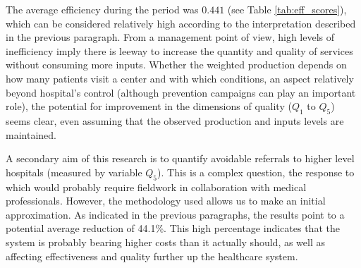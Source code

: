\documentclass[11pt,a4paper,oneside]{article}
\begin{document}

The average efficiency during the period was $0.441$ (see Table \ref{tab:eff_scores}), which can be considered relatively high according to the interpretation described in the previous paragraph. From a management point of view, high levels of inefficiency imply there is leeway to increase the quantity and quality of services without consuming more inputs. Whether the weighted production depends on how many patients visit a center and with which conditions, an aspect relatively beyond hospital's control (although prevention campaigns can play an important role), the potential for improvement in the dimensions of quality ($Q_1$ to $Q_5$) seems clear, even assuming that the observed production and inputs levels are maintained.


A secondary aim of this research is to quantify avoidable referrals to higher level hospitals (measured by variable $Q_5$). This is a complex question, the response to which would probably require fieldwork in collaboration with medical professionals. However, the methodology used allows us to make an initial approximation. As indicated in the previous paragraphs, the results point to a potential average reduction of 44.1\%. This high percentage indicates that the system is probably bearing higher costs than it actually should, as well as affecting effectiveness and quality further up the healthcare system.
\end{document}
